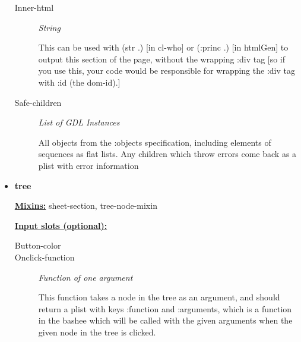 \documentclass [11pt]{book}
\begin{document}
\begin{itemize}
\begin{description}
\item [Inner-html]
\emph{String}

 This can be used with (str .) [in cl-who] or (:princ .) [in htmlGen]
to output this section of the page, without the wrapping :div tag [so if you use this,
your code would be responsible for wrapping the :div tag with :id (the dom-id).]




\item [Safe-children]
\emph{List of GDL Instances}

 All objects from the :objects specification, including elements of sequences
as flat lists. Any children which throw errors come back as a plist with error information




\end{description}







\item {}
\label{prim:tree}
\textbf{tree}


\textbf{
\underline{Mixins:}} sheet-section, tree-node-mixin





\begin{description}

\end{description}








\textbf{
\underline{Input slots (optional):}}

\begin{description}

\item [Button-color]





\item [Onclick-function]
\emph{Function of one argument}

 This function takes a node in the tree as an argument, and should return
a plist with keys :function and :arguments, which is a function in the bashee which will be called
with the given arguments when the given node in the tree is clicked.





\end{description}
\end{itemize}
\end{document}
